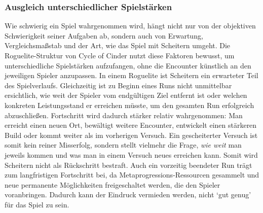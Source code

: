 \subsubsection{Ausgleich unterschiedlicher Spielstärken}
Wie schwierig ein Spiel wahrgenommen wird, hängt nicht nur von der objektiven Schwierigkeit seiner Aufgaben ab, sondern auch von Erwartung, Vergleichsmaßstab und der Art, wie das Spiel mit Scheitern umgeht.
Die Roguelite-Struktur von Cycle of Cinder nutzt diese Faktoren bewusst, um unterschiedliche Spielstärken aufzufangen, ohne die Encounter künstlich an den jeweiligen Spieler anzupassen.
In einem Roguelite ist Scheitern ein erwarteter Teil des Spielverlaufs.
Gleichzeitig ist zu Beginn eines Runs nicht unmittelbar ersichtlich, wie weit der Spieler vom endgültigen Ziel entfernt ist oder welchen konkreten Leistungsstand er erreichen müsste, um den gesamten Run erfolgreich abzuschließen.
Fortschritt wird dadurch stärker relativ wahrgenommen: Man erreicht einen neuen Ort, bewältigt weitere Encounter, entwickelt einen stärkeren Build oder kommt weiter als im vorherigen Versuch.
Ein gescheiterter Versuch ist somit kein reiner Misserfolg, sondern stellt vielmehr die Frage, \emph{wie weit} man jeweils kommen und was man in einem Versuch neues erreichen kann.
Somit wird Scheitern nicht als Rückschritt bestraft.
Auch ein vorzeitig beendeter Run trägt zum langfristigen Fortschritt bei, da Metaprogressions-Ressourcen gesammelt und neue permanente Möglichkeiten freigeschaltet werden, die den Spieler voranbringen.
Dadurch kann der Eindruck vermieden werden, nicht `gut genug' für das Spiel zu sein.

